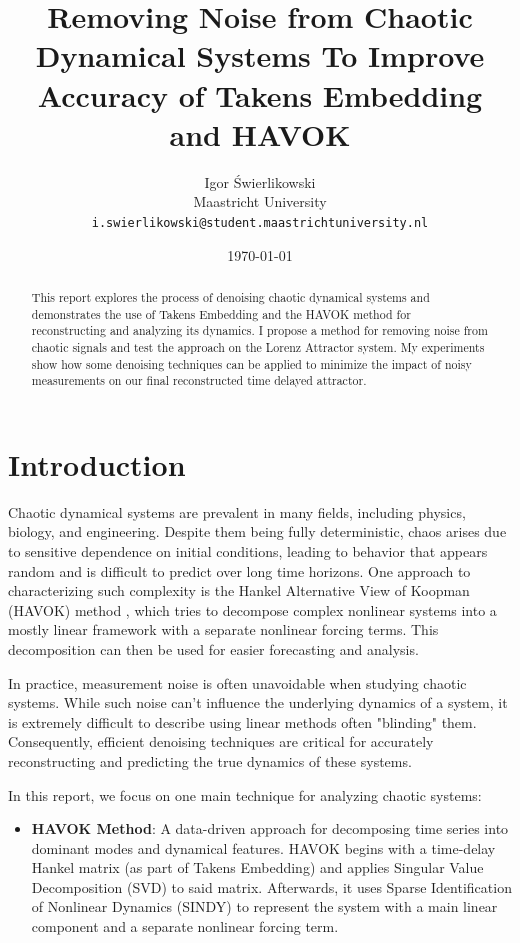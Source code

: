 \documentclass[11pt]{article}
\title{Removing Noise from Chaotic Dynamical Systems To Improve Accuracy of Takens Embedding and HAVOK}
\author{Igor Świerlikowski \\
	Maastricht University \\
	\texttt{i.swierlikowski@student.maastrichtuniversity.nl}}
\date{\today}
\begin{document}
	\maketitle
	
	\begin{abstract}
		This report explores the process of denoising chaotic dynamical systems and demonstrates the use of Takens Embedding and the HAVOK method for reconstructing and analyzing its dynamics. I propose a method for removing noise from chaotic signals and test the approach on the Lorenz Attractor system. My experiments show how some denoising techniques can be applied to minimize the impact of noisy measurements on our final reconstructed time delayed attractor.
	\end{abstract}
	
	\section{Introduction}
	Chaotic dynamical systems are prevalent in many fields, including physics, biology, and engineering. Despite them being fully deterministic, chaos arises due to sensitive dependence on initial conditions, leading to behavior that appears random and is difficult to predict over long time horizons. One approach to characterizing such complexity is the Hankel Alternative View of Koopman (HAVOK) method \citep{brunton2017}, which tries to decompose complex nonlinear systems into a mostly linear framework with a separate nonlinear forcing terms. This decomposition can then be used for easier forecasting and analysis.
	
	In practice, measurement noise is often unavoidable when studying chaotic systems. While such noise can't influence the underlying dynamics of a system, it is extremely difficult to describe using linear methods often "blinding" them. Consequently, efficient denoising techniques are critical for accurately reconstructing and predicting the true dynamics of these systems.
	
	In this report, we focus on one main technique for analyzing chaotic systems:
	\begin{itemize}
		\item \textbf{HAVOK Method}: A data-driven approach for decomposing time series into dominant modes and dynamical features. HAVOK begins with a time-delay Hankel matrix (as part of Takens Embedding) and applies Singular Value Decomposition (SVD) to said matrix. Afterwards, it uses Sparse Identification of Nonlinear Dynamics (SINDY) \citep{brunton2015} to represent the system with a main linear component and a separate nonlinear forcing term.
	\end{itemize}
	
\end{document}
